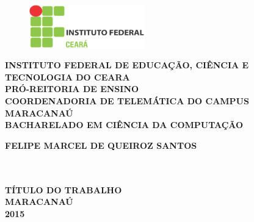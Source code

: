 \thispagestyle{empty}

\vfill
 \begin{center}
    \begin{figure}[t]
     \centering
            \includegraphics[width=5cm]{figures/IF_logo.eps}\\[-0.1in]
     \end{figure}

    {\large\bfseries INSTITUTO FEDERAL DE EDUCAÇÃO, CIÊNCIA E TECNOLOGIA DO CEARA} \\
    {\large\bfseries PRÓ-REITORIA DE ENSINO} \\
    {\large\bfseries COORDENADORIA DE TELEMÁTICA DO CAMPUS MARACANAÚ}  \\ 
    {\large\bfseries BACHARELADO EM CIÊNCIA DA COMPUTAÇÃO}  \\ 

    \vspace*{1in}
    \begin{large} \bfseries FELIPE MARCEL DE QUEIROZ SANTOS \end{large}\\[0.4in]

    \vspace*{4cm}
    \noindent \\
    \large\bfseries{TÍTULO DO TRABALHO} \\
    \vfill
    \large\bfseries{ MARACANAÚ \\ 2015}
\end{center}

\normalsize